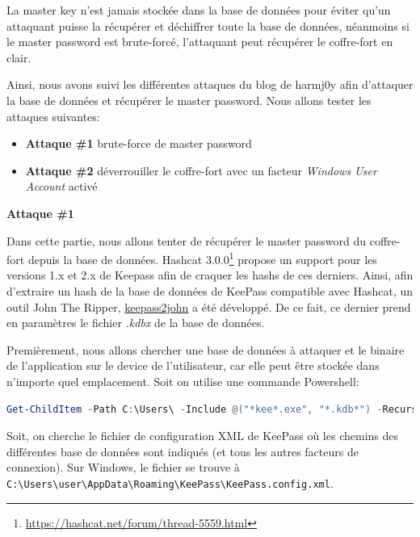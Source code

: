 La master key n'est jamais stockée dans la base de données pour éviter qu'un attaquant puisse la récupérer et déchiffrer toute la base de données, néanmoins si le master password est brute-forcé, l'attaquant peut récupérer le coffre-fort en clair. 

Ainsi, nous avons suivi les différentes attaques du blog de harmj0y \cite{crack} afin d'attaquer la base de données et récupérer le master password. Nous allons tester les attaques suivantes:

\begin{itemize}
	\item[--] \textbf{Attaque \#1} brute-force de master password
	\item[--] \textbf{Attaque \#2} déverrouiller le coffre-fort avec un facteur \textit{Windows User Account} activé
\end{itemize}

\textbf{Attaque \#1}

Dans cette partie, nous allons tenter de récupérer le master password du coffre-fort depuis la base de données. Hashcat 3.0.0\footnote{\href{https://hashcat.net/forum/thread-5559.html}{https://hashcat.net/forum/thread-5559.html}} propose un support pour les versions 1.x et 2.x de Keepass afin de craquer les hashs de ces derniers. Ainsi, afin d'extraire un hash de la base de données de KeePass compatible avec Hashcat, un outil John The Ripper, \href{https://fossies.org/linux/john/src/keepass2john.c}{keepass2john} a été développé. De ce fait, ce dernier prend en paramètres le fichier \textit{.kdbx} de la base de données. 

Premièrement, nous allons chercher une base de données à attaquer et le binaire de l'application sur le device de l'utilisateur, car elle peut être stockée dans n'importe quel emplacement. Soit on utilise une commande Powershell:

\begin{lstlisting}[language=PowerShell, caption=Commande Powershell pour chercher le fichier kdbx]
Get-ChildItem -Path C:\Users\ -Include @("*kee*.exe", "*.kdb*") -Recurse -ErrorAction SilentlyContinue | Select-Object -Expand FullName | fl
\end{lstlisting}

Soit, on cherche le fichier de configuration XML de KeePass où les chemins des différentes base de données sont indiqués (et tous les autres facteurs de connexion). Sur Windows, le fichier se trouve à \verb|C:\Users\user\AppData\Roaming\KeePass\KeePass.config.xml|.


